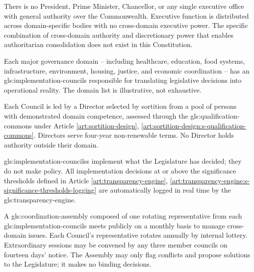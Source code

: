 


There is no President, Prime Minister, Chancellor, or any single executive office with general authority over the Commonwealth. Executive function is distributed across domain-specific bodies with no cross-domain executive power. The specific combination of cross-domain authority and discretionary power that enables authoritarian consolidation does not exist in this Constitution.


Each major governance domain -- including healthcare, education, food systems, infrastructure, environment, housing, justice, and economic coordination -- has an \gls{gls:implementation-councils} responsible for translating legislative decisions into operational reality. The domain list is illustrative, not exhaustive.

Each Council is led by a Director selected by sortition from a pool of persons with demonstrated domain competence, assessed through the \gls{gls:qualification-commons} under Article \ref{art:sortition-design}, \ref{art:sortition-design:s-qualification-commons}. Directors serve four-year non-renewable terms. No Director holds authority outside their domain.

\gls{gls:implementation-councils}s implement what the Legislature has decided; they do not make policy. All implementation decisions at or above the significance thresholds defined in Article \ref{art:transparency-engine}, \ref{art:transparency-engine:s-significance-thresholds-logging} are automatically logged in real time by the \gls{gls:transparency-engine}.

A \gls{gls:coordination-assembly} composed of one rotating representative from each \gls{gls:implementation-councils} meets publicly on a monthly basis to manage cross-domain issues. Each Council's representative rotates annually by internal lottery. Extraordinary sessions may be convened by any three member councils on fourteen days' notice. The Assembly may only flag conflicts and propose solutions to the Legislature; it makes no binding decisions.

